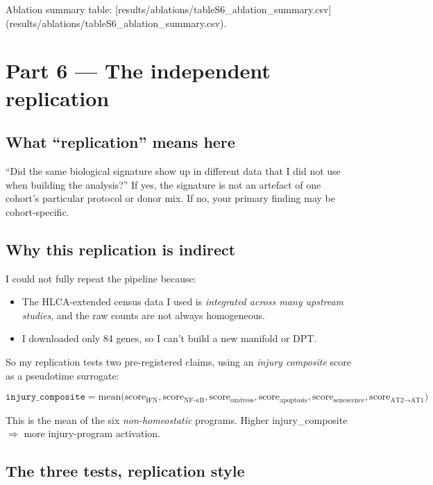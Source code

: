 \documentclass[11pt]{article}
\begin{document}
Ablation summary table:
[results/ablations/tableS6\_ablation\_summary.csv](results/ablations/tableS6_ablation_summary.csv).

\section{Part 6 --- The independent replication}

\subsection{What ``replication'' means here}

``Did the same biological signature show up in different data that I did not
use when building the analysis?'' If yes, the signature is not an artefact
of one cohort's particular protocol or donor mix. If no, your primary
finding may be cohort-specific.

\subsection{Why this replication is indirect}

I could not fully repeat the pipeline because:
\begin{itemize}
\item The HLCA-extended census data I used is \emph{integrated across many
      upstream studies}, and the raw counts are not always homogeneous.
\item I downloaded only 84 genes, so I can't build a new manifold or DPT.
\end{itemize}

So my replication tests two pre-registered claims, using an
\emph{injury composite} score as a pseudotime surrogate:

\[
\texttt{injury\_composite} = \text{mean}\Big(
  \text{score}_{\text{IFN}},
  \text{score}_{\text{NF-}\kappa\text{B}},
  \text{score}_{\text{oxstress}},
  \text{score}_{\text{apoptosis}},
  \text{score}_{\text{senescence}},
  \text{score}_{\text{AT2}\to\text{AT1}}
\Big)
\]

This is the mean of the six \emph{non-homeostatic} programs. Higher
injury\_composite $\Rightarrow$ more injury-program activation.

\subsection{The three tests, replication style}
\end{document}
